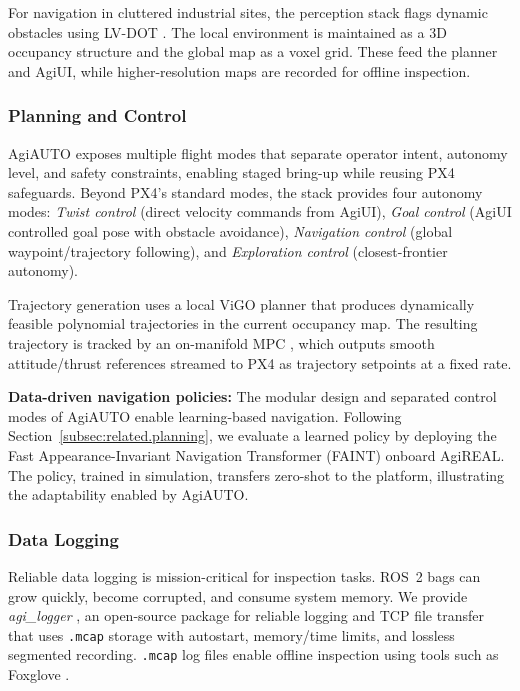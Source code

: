 \documentclass[letterpaper, 10 pt, conference]{ieeeconf}  %
\newcommand{\Agiautonomy}{AgiAUTO}
\newcommand{\Agiui}{AgiUI}
\newcommand{\Agihw}{AgiREAL}
\newcommand{\Agiautonomys}{AgiAUTO }
\newcommand{\Agiuis}{AgiUI }
\begin{document}
For navigation in cluttered industrial sites, the perception stack flags dynamic obstacles using LV-DOT \cite{LV-DOT}. The local environment is maintained as a 3D occupancy structure and the global map as a voxel grid. These feed the planner and \Agiui, while higher-resolution maps are recorded for offline inspection.

\subsubsection{Planning and Control} \label{sec:platform.sw.plan_ctrl}
\Agiautonomys exposes multiple flight modes that separate operator intent, autonomy level, and safety constraints, enabling staged bring-up while reusing PX4 safeguards. Beyond PX4's standard modes, the stack provides four autonomy modes: \emph{Twist control} (direct velocity commands from \Agiui), \emph{Goal control} (\Agiuis controlled goal pose with obstacle avoidance), \emph{Navigation control} (global waypoint/trajectory following), and \emph{Exploration control} (closest-frontier autonomy).

Trajectory generation uses a local ViGO planner \cite{xuVigoPlanner2026} that produces dynamically feasible polynomial trajectories in the current occupancy map. The resulting trajectory is tracked by an on-manifold MPC \cite{lu2022onmpc}, which outputs smooth attitude/thrust references streamed to PX4 as trajectory setpoints at a fixed rate.

\textbf{Data-driven navigation policies:} The modular design and separated control modes of \Agiautonomys enable learning-based navigation. Following Section~\ref{subsec:related.planning}, we evaluate a learned policy by deploying the Fast Appearance-Invariant Navigation Transformer (FAINT) \cite{suomela2025synthetic} onboard \Agihw. The policy, trained in simulation, transfers zero-shot to the platform, illustrating the adaptability enabled by \Agiautonomy.

\subsubsection{Data Logging}
Reliable data logging is mission-critical for inspection tasks. ROS~2 bags can grow quickly, become corrupted, and consume system memory. We provide \textit{agi\_logger} \cite{Kuruppuarachchi2026agi_logger}, an open-source package for reliable logging and TCP file transfer that uses \texttt{.mcap} storage with autostart, memory/time limits, and lossless segmented recording. \texttt{.mcap} log files enable offline inspection using tools such as Foxglove \cite{foxglove2026}.
\end{document}
